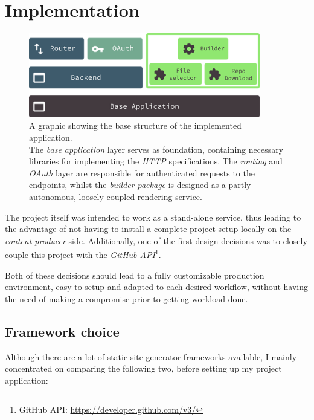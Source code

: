 \documentclass[a4paper,english,11pt]{report}
\begin{document}
\chapter{Implementation}

%
\begin{figure}[p]
    \centering
    \includegraphics[width=0.9\textwidth]{application_structure.png}
    \caption{A graphic showing the base structure of the implemented application.\\ The \emph{base application} layer serves as foundation, containing necessary libraries for implementing the \emph{HTTP} specifications. The \emph{routing} and \emph{OAuth} layer are responsible for authenticated requests to the endpoints, whilst the \emph{builder package} is designed as a partly autonomous, loosely coupled rendering service.}
    \label{fig:application_structure}
\end{figure}
%

The project itself was intended to work as a stand-alone service, thus leading to the advantage of not having to install a complete project setup locally on the \emph{content producer} side. Additionally, one of the first design decisions was to closely couple this project with the \emph{GitHub API}\footnote{GitHub API: \url{https://developer.github.com/v3/}}.

Both of these decisions should lead to a fully customizable production environment, easy to setup and adapted to each desired workflow, without having the need of making a compromise prior to getting workload done.

\section{Framework choice}
Although there are a lot of static site generator frameworks available, I mainly concentrated on comparing the following two, before setting up my project application:
\end{document}
